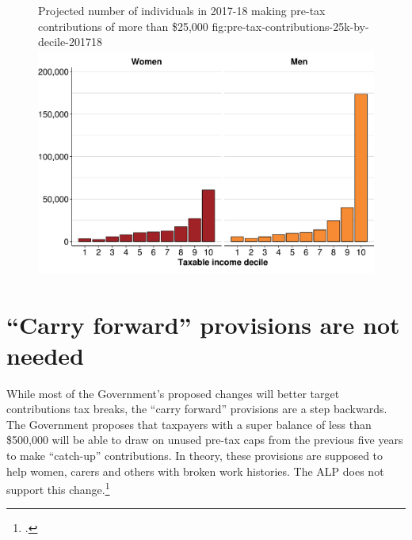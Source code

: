 \documentclass[continuous]{grattan}
\begin{document}
\begin{figure}%
%
{Projected number of individuals in 2017-18 making pre-tax contributions of more than \$25,000}%
{fig:pre-tax-contributions-25k-by-decile-201718}
\includegraphics[width=4.47222in,height=2.94759954545455in]{figure/n-individuals-contr-over-25k-by-decile-201718-1} 
\end{figure}


\section{``Carry forward'' provisions are not needed}\label{sec:carry-fwd-provisions-not-needed}

While most of the Government’s proposed changes will better target contributions tax breaks, the “carry forward” provisions are a step backwards. 
The Government proposes that taxpayers with a super balance of less than \$500,000 will be able to draw on unused pre-tax caps from the previous five years to make ``catch-up'' contributions.
In theory, these provisions are supposed to help women, carers and others with broken work histories. 
The ALP does not support this change.\footcite{Bowen-2016-Labors-plan-for-super-not-retrospective}
\end{document}
